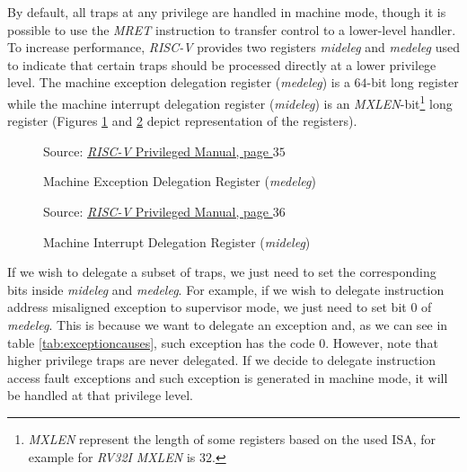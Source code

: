By default, all traps at any privilege are handled in machine mode, though it is
possible to use the \textit{MRET} instruction to transfer control to a lower-level
handler. To increase performance, \textit{RISC-V} provides two registers \textit{mideleg}
and \textit{medeleg} used to indicate that certain traps should be processed directly
at a lower privilege level. The machine exception delegation register (\textit{medeleg})
is a $64$-bit long register while the machine interrupt delegation register (\textit{mideleg})
is an \textit{MXLEN}-bit\footnote{\textit{MXLEN} represent the length of some registers
based on the used ISA, for example for \textit{RV32I} \textit{MXLEN} is $32$.}
long register (Figures \ref{fig:medeleg} and \ref{fig:mideleg} depict representation
of the registers). \\
\begin{figure}[H]
  \centering
  \def\stackalignment{r} %
  {\scriptsize Source: \href{https://drive.google.com/file/d/17GeetSnT5wW3xNuAHI95-SI1gPGd5sJ_/view}{\textit{RISC-V} Privileged Manual, page $35$}}
  \caption{Machine Exception Delegation Register (\textit{medeleg})}
  \label{fig:medeleg}
\end{figure}

\begin{figure}[H]
  \centering
  \def\stackalignment{r} %
  {\scriptsize Source: \href{https://drive.google.com/file/d/17GeetSnT5wW3xNuAHI95-SI1gPGd5sJ_/view}{\textit{RISC-V} Privileged Manual, page $36$}}
  \caption{Machine Interrupt Delegation Register (\textit{mideleg})}
  \label{fig:mideleg}
\end{figure}

If we wish to delegate a subset of traps, we just need to set the corresponding
bits inside \textit{mideleg} and \textit{medeleg}. For example, if we wish to
delegate instruction address misaligned exception to supervisor mode, we just need
to set bit $0$ of \textit{medeleg}. This is because we want to delegate an exception
and, as we can see in table \ref{tab:exceptioncauses}, such exception has the code
$0$. However, note that higher privilege traps are never delegated. If we decide
to delegate instruction access fault exceptions and such exception is generated
in machine mode, it will be handled at that privilege level.

